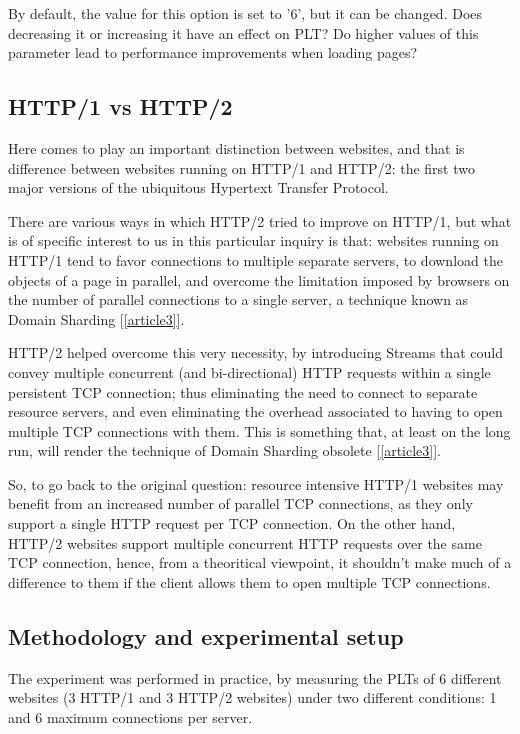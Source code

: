 \documentclass[a4paper,10pt]{article}
\begin{document}
By default, the value for this option is set to '6', but it can be changed. Does decreasing it or increasing it have an effect on PLT? Do higher values of this parameter lead to performance improvements when loading pages? 

\subsection{HTTP/1 vs HTTP/2}

Here comes to play an important distinction between websites, and that is difference between websites running on HTTP/1 and HTTP/2: the first two major versions of the ubiquitous Hypertext Transfer Protocol. 

There are various ways in which HTTP/2 tried to improve on HTTP/1, but what is of specific interest to us in this particular inquiry is that: websites running on HTTP/1 tend to favor connections to multiple separate servers, to download the objects of a page in parallel, and overcome the limitation imposed by browsers on the number of parallel connections to a single server, a technique known as Domain Sharding [\ref{article3}]. 

HTTP/2 helped overcome this very necessity, by introducing Streams that could convey multiple
concurrent (and bi-directional) HTTP requests within a single persistent TCP connection; thus eliminating the need to connect to separate resource servers, and even eliminating the overhead associated to having to open multiple TCP connections with them. This is something that, at least on the long run, will render the technique of Domain Sharding obsolete [\ref{article3}].

So, to go back to the original question: resource intensive HTTP/1 websites may benefit from an increased number of parallel TCP connections, as they only support a single HTTP request per TCP connection. On the other hand, HTTP/2 websites support multiple concurrent HTTP requests over the same TCP connection, hence, from a theoritical viewpoint, it shouldn't make much of a difference to them if the client allows them to open multiple TCP connections.


\subsection{Methodology and experimental setup}

The experiment was performed in practice, by measuring the PLTs of 6 different websites (3 HTTP/1 and 3 HTTP/2 websites) under two different conditions: 1 and 6 maximum connections per server.
\end{document}
